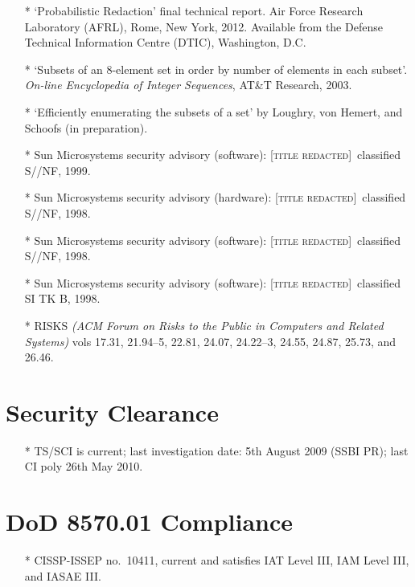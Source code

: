\documentclass[letterpaper]{article}
\newcommand{\redacted}{\textsc{[title redacted]}}
\begin{document}
\begin{itemize}
	\item[*] `Probabilistic Redaction' final technical report. Air Force Research
		Laboratory (AFRL), Rome, New York, 2012.  Available from the Defense Technical
		Information Centre (DTIC), Washington, D.C.

	\item[*] `Subsets of an 8-element set in order by number of elements in each
		subset'. \emph{On-line Encyclopedia of Integer Sequences}, AT\&T Research, 2003.

	\item[*] `Efficiently enumerating the subsets of a set' by Loughry, von Hemert,
		and Schoofs (in preparation).

    \item[*] Sun Microsystems security advisory (software): \redacted\ classified S//NF, 1999.
	\item[*] Sun Microsystems security advisory (hardware): \redacted\ classified S//NF, 1998.
	\item[*] Sun Microsystems security advisory (software): \redacted\ classified S//NF, 1998.
	\item[*] Sun Microsystems security advisory (software): \redacted\ classified SI TK B, 1998.

    \item[*] RISKS \emph{(ACM Forum on Risks to the Public in Computers
    and Related Systems)} vols 17.31, 21.94--5, 22.81, 24.07,
    24.22--3, 24.55, 24.87, 25.73, and 26.46.
\end{itemize}

\section*{Security Clearance}

\begin{itemize}
	\item[*] TS/SCI is current; last investigation date: 5th August 2009 (SSBI PR);
		last CI poly 26th May 2010.
\end{itemize}

\section*{DoD 8570.01 Compliance}

\begin{itemize}
	\item[*] CISSP-ISSEP no.\ 10411, current and satisfies IAT Level III, IAM Level III,
		and IASAE III.
\end{itemize}
\end{document}
